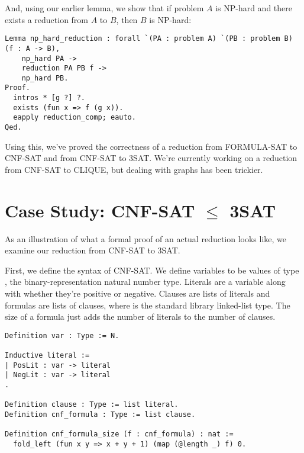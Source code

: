 \documentclass{article}
\begin{document}
And, using our earlier lemma, we show that if problem $A$ is NP-hard and there
exists a reduction from $A$ to $B$, then $B$ is NP-hard:
\begin{samepage}
  \begin{verbatim}
Lemma np_hard_reduction : forall `(PA : problem A) `(PB : problem B) (f : A -> B),
    np_hard PA ->
    reduction PA PB f ->
    np_hard PB.
Proof.
  intros * [g ?] ?.
  exists (fun x => f (g x)).
  eapply reduction_comp; eauto.
Qed.
  \end{verbatim}
\end{samepage}

Using this, we've proved the correctness of a reduction from FORMULA-SAT to
CNF-SAT and from CNF-SAT to 3SAT. We're currently working on a reduction from
CNF-SAT to CLIQUE, but dealing with graphs has been trickier.

\section{Case Study: CNF-SAT $\leq$ 3SAT}

As an illustration of what a formal proof of an actual reduction looks like, we
examine our reduction from CNF-SAT to 3SAT.


First, we define the syntax of CNF-SAT. We define variables to be values of type
, the binary-representation natural number type. Literals are a variable
along with whether they're positive or negative. Clauses are lists of literals
and formulas are lists of clauses, where  is the standard library
linked-list type. The size of a formula just adds the number of literals to the
number of clauses.
\begin{samepage}
  \begin{verbatim}
Definition var : Type := N.

Inductive literal :=
| PosLit : var -> literal
| NegLit : var -> literal
.

Definition clause : Type := list literal.
Definition cnf_formula : Type := list clause.

Definition cnf_formula_size (f : cnf_formula) : nat :=
  fold_left (fun x y => x + y + 1) (map (@length _) f) 0.
  \end{verbatim}
\end{samepage}
\end{document}
